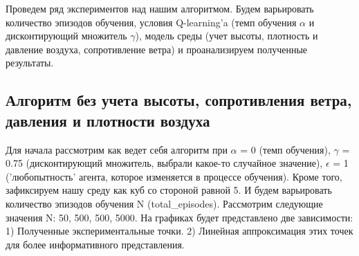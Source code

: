 \documentclass[a4paper]{report}
\theoremstyle{definition}
\theoremstyle{plain}
\theoremstyle{remark}
\theoremstyle{remark}
\theoremstyle{definition}
\begin{document}
Проведем ряд экспериментов над нашим алгоритмом. Будем варьировать количество эпизодов обучения, условия Q-learning'a (темп обучения $\alpha$ и дисконтирующий множитель $\gamma$), модель среды (учет высоты, плотность и давление воздуха, сопротивление ветра) и проанализируем полученные результаты.
\\
\begin{center}
    \subsection{Алгоритм без учета высоты, сопротивления ветра, давления и плотности воздуха}
\end{center}

Для начала рассмотрим как ведет себя алгоритм при $\alpha$ = 0 (темп обучения), $\gamma$ = 0.75 (дисконтирующий множитель, выбрали какое-то случайное значение), $\epsilon$ = 1 ('любопытность'  агента, которое изменяется в процессе обучения). Кроме того, зафиксируем нашу среду как куб со стороной равной 5. И будем варьировать количество эпизодов обучения N (total\_episodes). Рассмотрим следующие значения N: 50, 500, 500, 5000. На графиках будет представлено две зависимости: 1) Полученные экспериментальные точки. 2) Линейная аппроксимация этих точек для более информативного представления. 
\end{document}

